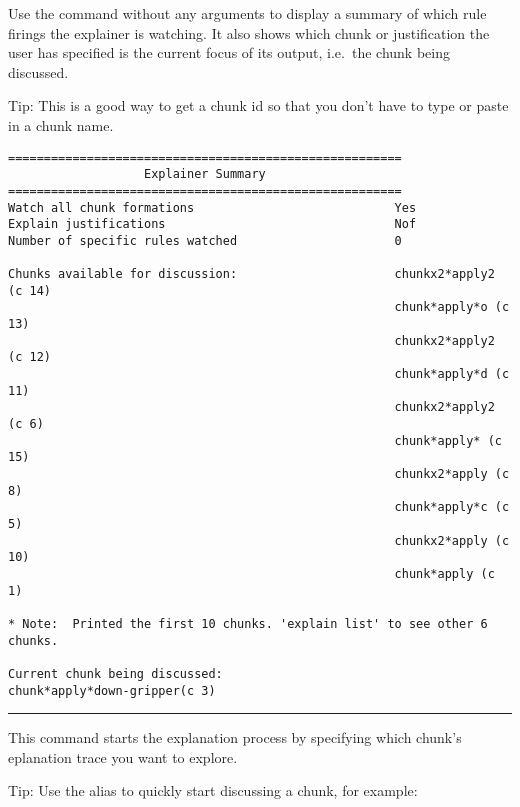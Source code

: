 Use the  command without any arguments to display a summary of which rule firings the explainer is watching. It also shows which chunk or justification the user has specified is the current focus of its output, i.e.~the chunk being discussed.

Tip: This is a good way to get a chunk id so that you don't have to type or paste in a chunk name.

{\footnotesize
\begin{verbatim}
=======================================================
                   Explainer Summary
=======================================================
Watch all chunk formations                            Yes
Explain justifications                                Nof
Number of specific rules watched                      0

Chunks available for discussion:                      chunkx2*apply2 (c 14)
                                                      chunk*apply*o (c 13)
                                                      chunkx2*apply2 (c 12)
                                                      chunk*apply*d (c 11)
                                                      chunkx2*apply2 (c 6)
                                                      chunk*apply* (c 15)
                                                      chunkx2*apply (c 8)
                                                      chunk*apply*c (c 5)
                                                      chunkx2*apply (c 10)
                                                      chunk*apply (c 1)

* Note:  Printed the first 10 chunks. 'explain list' to see other 6 chunks.

Current chunk being discussed:                        chunk*apply*down-gripper(c 3)

\end{verbatim}
}

\rule{\textwidth}{1pt}

\textbf{}

This command starts the explanation process by specifying which chunk's eplanation trace you want to explore.

Tip: Use the alias  to quickly start discussing a chunk, for example:

